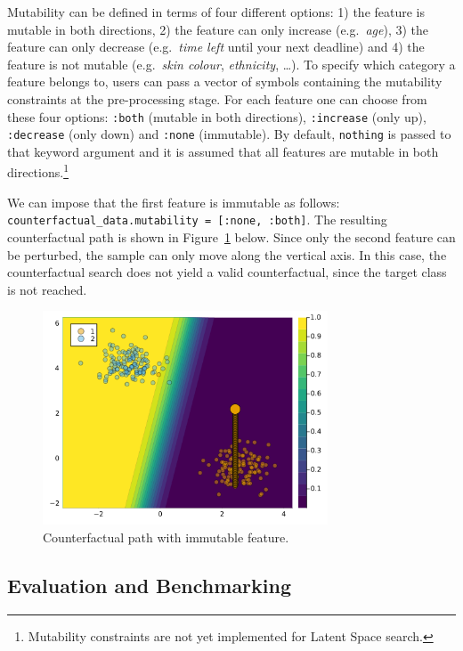 \documentclass[
  letterpaper,
  DIV=11,
  numbers=noendperiod]{scrartcl}
\begin{document}
Mutability can be defined in terms of four different options: 1) the
feature is mutable in both directions, 2) the feature can only increase
(e.g.~\emph{age}), 3) the feature can only decrease (e.g.~\emph{time
left} until your next deadline) and 4) the feature is not mutable
(e.g.~\emph{skin colour}, \emph{ethnicity}, \ldots). To specify which
category a feature belongs to, users can pass a vector of symbols
containing the mutability constraints at the pre-processing stage. For
each feature one can choose from these four options: \texttt{:both}
(mutable in both directions), \texttt{:increase} (only up),
\texttt{:decrease} (only down) and \texttt{:none} (immutable). By
default, \texttt{nothing} is passed to that keyword argument and it is
assumed that all features are mutable in both directions.\footnote{Mutability
  constraints are not yet implemented for Latent Space search.}

We can impose that the first feature is immutable as follows:
\texttt{counterfactual\_data.mutability\ =\ {[}:none,\ :both{]}}. The
resulting counterfactual path is shown in Figure~\ref{fig-mutability}
below. Since only the second feature can be perturbed, the sample can
only move along the vertical axis. In this case, the counterfactual
search does not yield a valid counterfactual, since the target class is
not reached.

\begin{figure}

{\centering \includegraphics[width=3.33333in,height=2.5in]{www/constraint_mutability.png}

}

\caption{\label{fig-mutability}Counterfactual path with immutable
feature.}

\end{figure}

\hypertarget{sec-eval}{%
\subsection{Evaluation and Benchmarking}\label{sec-eval}}
\end{document}
